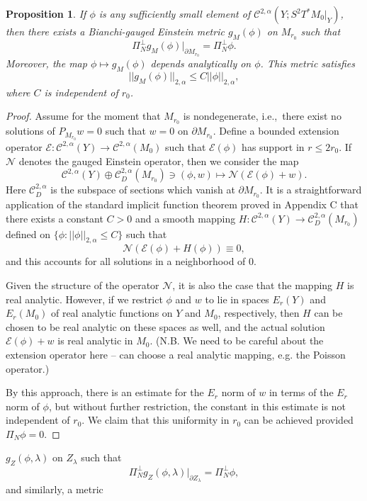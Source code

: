 \documentclass[12pt]{article}
\newtheorem{prop}[thm]{Proposition}
\newcommand{\del}{\partial}
\newcommand{\calN}{\mathcal N}
\newcommand{\calE}{\mathcal E}
\newcommand{\calC}{\mathcal C}
\begin{document}
\begin{prop} If $\phi$ is any sufficiently small element of $\calC^{2,\alpha}(Y;  S^2T^*M_0|_Y)$, then there exists a 
Bianchi-gauged Einstein metric $g_M(\phi)$ on $M_{r_0}$ such that 
\[
\Pi_N^\perp g_M(\phi)|_{\del M_{r_0}} = \Pi_N^\perp \phi.
\]
Moreover, the map $\phi \mapsto g_M(\phi)$ depends analytically on $\phi$.  This metric satisfies
\[
||g_M(\phi)||_{2,\alpha} \leq C ||\phi||_{2,\alpha},
\]
where $C$ is independent of $r_0$. 
\end{prop}
\begin{proof}
Assume for the moment that $M_{r_0}$ is nondegenerate, i.e.,\ there exist no solutions of $P_{M_{r_0}} w = 0$ such that
$w = 0$ on $\del M_{r_0}$.  Define a bounded extension operator $\calE: \calC^{2,\alpha}(Y) \to \calC^{2,\alpha}(M_0)$
such that $\calE(\phi)$ has support in $r \leq 2r_0$.  If $\calN$ denotes the gauged Einstein operator, then we consider
the map
\[
\calC^{2,\alpha}(Y) \oplus \calC^{2,\alpha}_D(M_{r_0}) \ni (\phi, w)  \longmapsto \calN( \calE(\phi) + w).
\]
Here $\calC^{2,\alpha}_D$ is the subspace of sections which vanish at $\del M_{r_0}$.  It is a straightforward application of the standard
implicit function theorem proved in Appendix C that there exists a constant $C > 0$ and a smooth mapping $H: \calC^{2,\alpha}(Y) 
\to \calC^{2,\alpha}_D(M_{r_0})$ defined on  $\{ \phi: ||\phi||_{2,\alpha} \leq C \}$ such that
\[
\calN( \calE(\phi) + H(\phi)) \equiv 0,
\]
and this accounts for all solutions in a neighborhood of $0$.   

Given the structure of the operator $\calN$, it is also the case that the mapping $H$ is real analytic. However, if we
restrict $\phi$ and $w$ to lie in spaces $E_r(Y)$ and $E_r(M_0)$ of real analytic functions on $Y$ and $M_0$, 
respectively, then $H$ can be chosen to be real analytic on these spaces as well, and the actual solution $\calE(\phi) + w$
is real analytic in $M_0$.  (N.B. We need to be careful about the extension operator here -- can choose a real analytic
mapping, e.g. the Poisson operator.) 

By this approach, there is an estimate for the $E_r$ norm of $w$ in terms of the $E_r$ norm of $\phi$, but without
further restriction, the constant in this estimate is not independent of $r_0$.   We claim that this uniformity in $r_0$
can be achieved provided $\Pi_N \phi = 0$.   

\end{proof}

$g_Z(\phi,\lambda)$ on $Z_\lambda$ such that
\[
\Pi_N^\perp  g_Z(\phi,\lambda)|_{\del Z_\lambda} = \Pi_N^\perp \phi,
\]
and similarly, a metric
\end{document}
